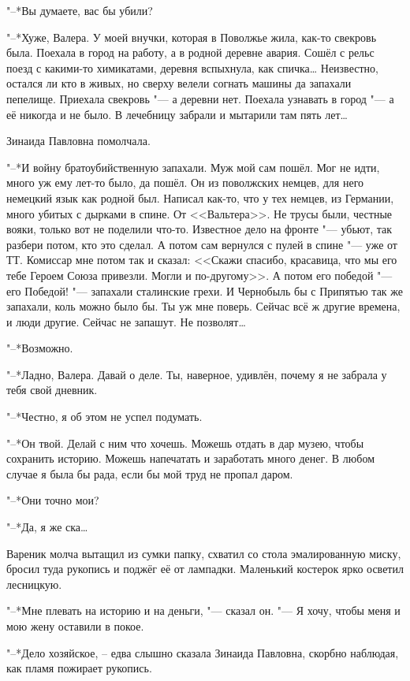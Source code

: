 "--*Вы думаете, вас бы убили?

"--*Хуже, Валера.
У моей внучки, которая в Поволжье жила, как-то свекровь была.
Поехала в город на работу, а в родной деревне авария.
Сошёл с рельс поезд с какими-то химикатами, деревня вспыхнула, как спичка\ldots{}
Неизвестно, остался ли кто в живых, но сверху велели согнать машины да запахали пепелище.
Приехала свекровь "--- а деревни нет.
Поехала узнавать в город "--- а её никогда и не было.
В лечебницу забрали и мытарили там пять лет\ldots{}

Зинаида Павловна помолчала.

"--*И войну братоубийственную запахали.
Муж мой сам пошёл.
Мог не идти, много уж ему лет-то было, да пошёл.
Он из поволжских немцев, для него немецкий язык как родной был.
Написал как-то, что у тех немцев, из Германии, много убитых с дырками в спине.
От <<Вальтера>>.
Не трусы были, честные вояки, только вот не поделили что-то.
Известное дело на фронте "--- убьют, так разбери потом, кто это сделал.
А потом сам вернулся с пулей в спине "--- уже от ТТ.
Комиссар мне потом так и сказал: <<Скажи спасибо, красавица, что мы его тебе Героем Союза привезли.
Могли и по-другому>>.
А потом его победой "--- его Победой! "--- запахали сталинские грехи.
И Чернобыль бы с Припятью так же запахали, коль можно было бы.
Ты уж мне поверь.
Сейчас всё ж другие времена, и люди другие.
Сейчас не запашут.
Не позволят\ldots{}

"--*Возможно.

"--*Ладно, Валера.
Давай о деле.
Ты, наверное, удивлён, почему я не забрала у тебя свой дневник.

"--*Честно, я об этом не успел подумать.

"--*Он твой.
Делай с ним что хочешь.
Можешь отдать в дар музею, чтобы сохранить историю.
Можешь напечатать и заработать много денег.
В любом случае я была бы рада, если бы мой труд не пропал даром.

"--*Они точно мои?

"--*Да, я же ска\ldots{}

Вареник молча вытащил из сумки папку, схватил со стола эмалированную миску, бросил туда рукопись и поджёг её от лампадки.
Маленький костерок ярко осветил лесницкую.

"--*Мне плевать на историю и на деньги, "--- сказал он.
"--- Я хочу, чтобы меня и мою жену оставили в покое.

"--*Дело хозяйское, -- едва слышно сказала Зинаида Павловна, скорбно наблюдая, как пламя пожирает рукопись.

